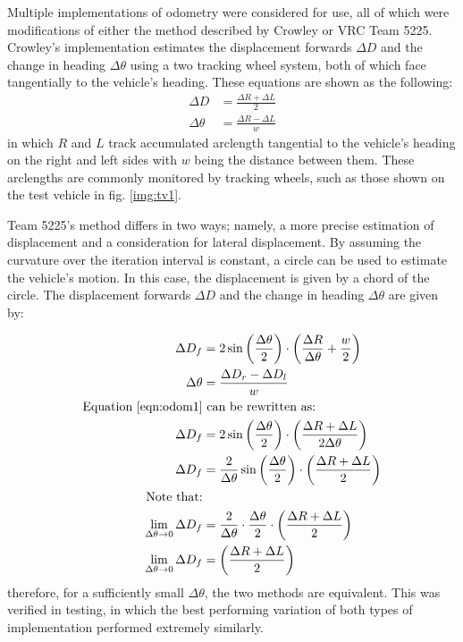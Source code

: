 \documentclass[mla7]{mla}
\begin{document}
\begin{paper}
Multiple implementations of odometry were considered for use, all of which were modifications of either the method described by Crowley or VRC Team 5225. Crowley's implementation estimates the displacement forwards $\Delta D$ and the change in heading $\Delta \theta$ using a two tracking wheel system, both of which face tangentially to the vehicle's heading. These equations are shown as the following:
\begin{subequations}
\begin{align}
\Delta D &= \frac{\Delta R+\Delta L}{2} \\
\Delta \theta &= \frac{\Delta R- \Delta L}{w}
\end{align}
\end{subequations}
in which $R$ and $L$ track accumulated arclength tangential to the vehicle's heading on the right and left sides with $w$ being the distance between them. These arclengths are commonly monitored by tracking wheels, such as those shown on the test vehicle in fig. \ref{img:tv1}.

Team 5225's method differs in two ways; namely, a more precise estimation of displacement and a consideration for lateral displacement. By assuming the curvature over the iteration interval is constant, a circle can be used to estimate the vehicle's motion. In this case, the displacement is given by a chord of the circle. The displacement forwards $\Delta D$ and the change in heading $\Delta \theta$ are given by:

\begin{subequations}
\begin{align}
\Delta D_f &= 2\sin{\left(\frac{\Delta\theta}{2}\right)} \cdot \left(\frac{\Delta R}{\Delta \theta}+\frac{w}{2}\right) \label{eqn:odom1}\\
\Delta \theta &= \frac{\Delta D_r- \Delta D_l}{w} \\
\text{Equation \ref{eqn:odom1}}& \text{  can be rewritten as:} \nonumber \\
\Delta D_f &= 2\sin{\left(\frac{\Delta\theta}{2}\right)} \cdot \left(\frac{\Delta R + \Delta L}{2\Delta \theta}\right) \\
\Delta D_f &= \frac{2}{\Delta \theta}\sin{\left(\frac{\Delta\theta}{2}\right)} \cdot \left(\frac{\Delta R + \Delta L}{2}\right) \\
\text{Note that:} \nonumber \\
\lim_{\Delta\theta\to 0} \Delta D_f &= \frac{2}{\Delta \theta} \cdot \frac{\Delta\theta}{2} \cdot \left(\frac{\Delta R + \Delta L}{2}\right) \\ 
\lim_{\Delta\theta\to 0} \Delta D_f &= \left(\frac{\Delta R + \Delta L}{2}\right)
\end{align}
\end{subequations}
therefore, for a sufficiently small $\Delta \theta$, the two methods are equivalent. This was verified in testing, in which the best performing variation of both types of implementation performed extremely similarly.


\end{paper}
\end{document}
